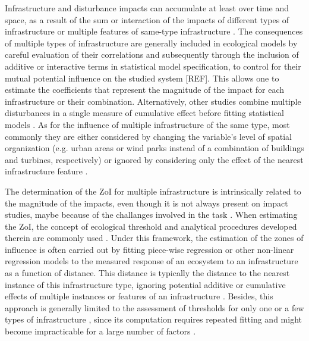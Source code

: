\documentclass[titlepage]{article}
\begin{document}
Infrastructure and disturbance impacts can accumulate at least over time and space, as a result of the sum or interaction of the impacts of different types of infrastructure or multiple features of same-type infrastructure \citep{wolfe_response_2000}. The consequences of multiple types of infrastructure are generally included in ecological models by careful evaluation of their correlations \citep{dormann_collinearity_2013} and subsequently through the inclusion of additive or interactive terms in statistical model specification, to control for their mutual potential influence on the studied system [REF]. This allows one to estimate the coefficients that represent the magnitude of the impact for each infrastructure or their combination. Alternatively, other studies combine multiple disturbances in a single measure of cumulative effect before fitting statistical models \citep{polfus_identifying_2011, venter_sixteen_2016, tucker_moving_2018}. As for the influence of multiple infrastructure of the same type, most commonly they are either considered by changing the variable's level of spatial organization (e.g. urban areas or wind parks instead of a combination of buildings and turbines, respectively) or ignored by considering only the effect of the nearest infrastructure feature \citep[e.g.][]{torres_assessing_2016}. 

The determination of the ZoI for multiple infrastructure is intrinsically related to the magnitude of the impacts, even though it is not always present on impact studies, maybe because of the challanges involved in the task  \citep{quinonezpinon_design_2007}. When estimating the ZoI, the concept of ecological threshold \citep{huggett_concept_2005} and analytical procedures developed therein are commonly used \citep{ficetola_ecological_2009}. Under this framework, the estimation of the zones of influence is often carried out by fitting piece-wise regression or other non-linear regression models \citep[such as an exponential decay or generalized additive models;][]{skarin_out_2018, ficetola_ecological_2009} to the measured response of an ecosystem to an infrastructure as a function of distance. This distance is typically the distance to the nearest instance of this infrastructure type, ignoring potential additive or cumulative effects of multiple instances or features of an infrastructure \citep[e.g ][Box 1]{torres_assessing_2016}. Besides, this approach is generally limited to the assessment of thresholds for only one or a few types of infrastructure \citep[e.g.][]{boulanger_estimating_2012}, since its computation requires repeated fitting and might become impracticable for a large number of factors \citep{lee_estimating_2020}. 
\end{document}
